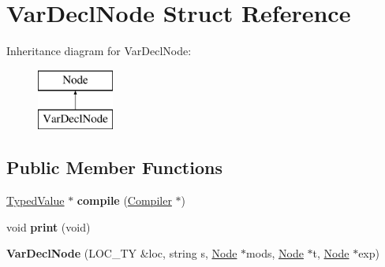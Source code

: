 \hypertarget{structVarDeclNode}{}\section{Var\+Decl\+Node Struct Reference}
\label{structVarDeclNode}
Inheritance diagram for Var\+Decl\+Node\+:\begin{figure}[H]
\begin{center}
\leavevmode
\includegraphics[height=2.000000cm]{structVarDeclNode}
\end{center}
\end{figure}
\subsection*{Public Member Functions}
\begin{DoxyCompactItemize}
\item 
\mbox{\label{structVarDeclNode_a67e1098c649924df2c483fb658f17d8e}} 
\hyperlink{structTypedValue}{Typed\+Value} $\ast$ {\bfseries compile} (\hyperlink{structante_1_1Compiler}{Compiler} $\ast$)
\item 
\mbox{\label{structVarDeclNode_a982a6f2c2b96b6bbd380f8613954d220}} 
void {\bfseries print} (void)
\item 
\mbox{\label{structVarDeclNode_add0f822579ca82c07aa65455e503dc09}} 
{\bfseries Var\+Decl\+Node} (L\+O\+C\+\_\+\+TY \&loc, string s, \hyperlink{structNode}{Node} $\ast$mods, \hyperlink{structNode}{Node} $\ast$t, \hyperlink{structNode}{Node} $\ast$exp)
\end{DoxyCompactItemize}
